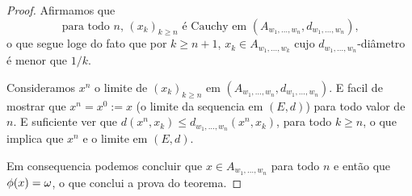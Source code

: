 \begin{proof}
  Afirmamos que
  \begin{equation}
    \text{para todo $n$, $(x_k)_{k \geq n}$ é Cauchy em $(A_{w_1, \dots, w_n}, d_{w_1, \dots, w_n})$,}
  \end{equation}
 o que segue loge do fato que por $k \geq n+1$, $x_k \in A_{w_1, \dots, w_{k}}$ cujo $d_{w_1, \dots, w_{n}}$-diâmetro é menor que $1/k$.
 
 \medskip
 
 Consideramos $x^n$ o limite de $(x_k)_{k\ge n}$ em $(A_{w_1, \dots, w_n}, d_{w_1, \dots, w_n})$. 
 E facil de mostrar que $x^n=x^0:=x$ (o limite da sequencia em $(E,d)$) para todo valor de $n$.
 E suficiente ver que  $d(x^n,x_k)\le d_{w_1, \dots, w_n}(x^n,x_k)$, para todo $k\ge n$, o que implica que $x^n$ e o limite em $(E,d)$.
 
 \medskip
 
 Em consequencia podemos concluir que $x\in A_{w_1, \dots, w_n}$ para todo $n$ e então que $\phi(x)=\omega$, o que conclui a prova do teorema.
\end{proof}

